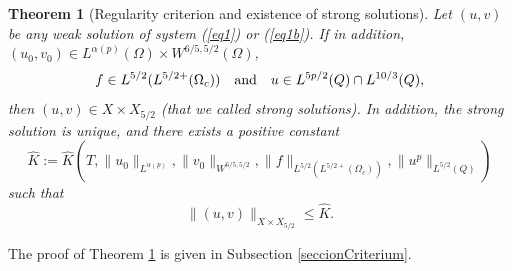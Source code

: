 \documentclass[11pt,reqno]{amsart}%
\newtheorem{theorem}{Theorem}[section]
\numberwithin{equation}{section}
\begin{document}
\begin{theorem}[Regularity criterion and existence of strong solutions]\label{strong}
Let $(u,v)$ be any weak solution of system (\ref{eq1}) or (\ref{eq1b}).
If in addition, 
$(u_0,v_0)\in L^{\alpha(p)}(\Omega)\times W^{6/5,5/2}(\Omega)$, 
  \begin{equation}\label{reg-crit}
f\in L^{5/2}(L^{5/2+}(\Omega_c)) \quad \hbox{and}\quad u\in L^{5p/2}(Q)\cap L^{10/3}(Q),
\end{equation}
then $(u,v)\in  X \times X_{5/2}$ (that we called strong solutions).  In addition, the strong solution is unique, and there exists a positive constant 
$$\widehat{K}:=\widehat{K}(T,
\|u_0\|_{L^{\alpha(p)}},
\|v_0\|_{W^{6/5,5/2}},\|f\|_{L^{5/2}(L^{5/2+}(\Omega_c))}, \|u^p\|_{L^{5/2}(Q)})$$ such that
\begin{equation}\label{bound_sol}
\|(u,v)\|_{ X\times X_{5/2}}\le \widehat{K}.
\end{equation}
\end{theorem}
The proof of Theorem \ref{strong} is given in Subsection \ref{seccionCriterium}.
%
\end{document}
